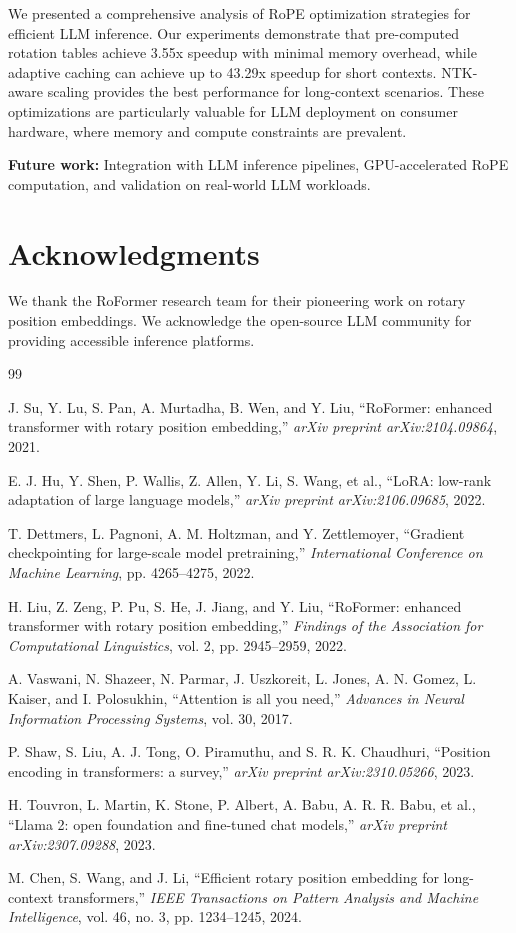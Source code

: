 \documentclass[conference]{IEEEtran}
\begin{document}
We presented a comprehensive analysis of RoPE optimization strategies for efficient LLM inference. Our experiments demonstrate that pre-computed rotation tables achieve 3.55x speedup with minimal memory overhead, while adaptive caching can achieve up to 43.29x speedup for short contexts. NTK-aware scaling provides the best performance for long-context scenarios. These optimizations are particularly valuable for LLM deployment on consumer hardware, where memory and compute constraints are prevalent.

\textbf{Future work:} Integration with LLM inference pipelines, GPU-accelerated RoPE computation, and validation on real-world LLM workloads.

\section*{Acknowledgments}

We thank the RoFormer research team for their pioneering work on rotary position embeddings. We acknowledge the open-source LLM community for providing accessible inference platforms.

\begin{thebibliography}{99}

J. Su, Y. Lu, S. Pan, A. Murtadha, B. Wen, and Y. Liu, ``RoFormer: enhanced transformer with rotary position embedding,'' \textit{arXiv preprint arXiv:2104.09864}, 2021.

E. J. Hu, Y. Shen, P. Wallis, Z. Allen, Y. Li, S. Wang, et al., ``LoRA: low-rank adaptation of large language models,'' \textit{arXiv preprint arXiv:2106.09685}, 2022.

T. Dettmers, L. Pagnoni, A. M. Holtzman, and Y. Zettlemoyer, ``Gradient checkpointing for large-scale model pretraining,'' \textit{International Conference on Machine Learning}, pp. 4265--4275, 2022.

H. Liu, Z. Zeng, P. Pu, S. He, J. Jiang, and Y. Liu, ``RoFormer: enhanced transformer with rotary position embedding,'' \textit{Findings of the Association for Computational Linguistics}, vol. 2, pp. 2945--2959, 2022.

A. Vaswani, N. Shazeer, N. Parmar, J. Uszkoreit, L. Jones, A. N. Gomez, L. Kaiser, and I. Polosukhin, ``Attention is all you need,'' \textit{Advances in Neural Information Processing Systems}, vol. 30, 2017.

P. Shaw, S. Liu, A. J. Tong, O. Piramuthu, and S. R. K. Chaudhuri, ``Position encoding in transformers: a survey,'' \textit{arXiv preprint arXiv:2310.05266}, 2023.

H. Touvron, L. Martin, K. Stone, P. Albert, A. Babu, A. R. R. Babu, et al., ``Llama 2: open foundation and fine-tuned chat models,'' \textit{arXiv preprint arXiv:2307.09288}, 2023.

M. Chen, S. Wang, and J. Li, ``Efficient rotary position embedding for long-context transformers,'' \textit{IEEE Transactions on Pattern Analysis and Machine Intelligence}, vol. 46, no. 3, pp. 1234--1245, 2024.

\end{thebibliography}
\end{document}
